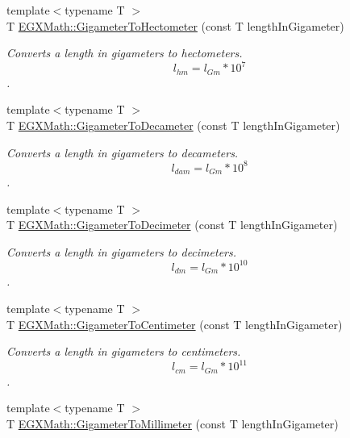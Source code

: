 \begin{DoxyCompactItemize}
{\footnotesize template$<$typename T $>$ }\\T \mbox{\hyperlink{group___e_g_x_math-_conversions-_length_conversions-_gigameter-_s_i_ga25121199c511ed43c20fa9c9bdefc0ca}{E\+G\+X\+Math\+::\+Gigameter\+To\+Hectometer}} (const T length\+In\+Gigameter)
\begin{DoxyCompactList}\small\item\em Converts a length in gigameters to hectometers. \[ l_{hm}=l_{Gm} * 10^{7} \]. \end{DoxyCompactList}\item 
{\footnotesize template$<$typename T $>$ }\\T \mbox{\hyperlink{group___e_g_x_math-_conversions-_length_conversions-_gigameter-_s_i_gab0233167d63c136801ae42faabe64263}{E\+G\+X\+Math\+::\+Gigameter\+To\+Decameter}} (const T length\+In\+Gigameter)
\begin{DoxyCompactList}\small\item\em Converts a length in gigameters to decameters. \[ l_{dam}=l_{Gm} * 10^{8} \]. \end{DoxyCompactList}\item 
{\footnotesize template$<$typename T $>$ }\\T \mbox{\hyperlink{group___e_g_x_math-_conversions-_length_conversions-_gigameter-_s_i_ga9333dddd3642cf160b026516dd760576}{E\+G\+X\+Math\+::\+Gigameter\+To\+Decimeter}} (const T length\+In\+Gigameter)
\begin{DoxyCompactList}\small\item\em Converts a length in gigameters to decimeters. \[ l_{dm}=l_{Gm} * 10^{10} \]. \end{DoxyCompactList}\item 
{\footnotesize template$<$typename T $>$ }\\T \mbox{\hyperlink{group___e_g_x_math-_conversions-_length_conversions-_gigameter-_s_i_gac0fc033ff4b887e157a333cde344b824}{E\+G\+X\+Math\+::\+Gigameter\+To\+Centimeter}} (const T length\+In\+Gigameter)
\begin{DoxyCompactList}\small\item\em Converts a length in gigameters to centimeters. \[ l_{cm}=l_{Gm} * 10^{11} \]. \end{DoxyCompactList}\item 
{\footnotesize template$<$typename T $>$ }\\T \mbox{\hyperlink{group___e_g_x_math-_conversions-_length_conversions-_gigameter-_s_i_ga91b617f8bf6330f1379d3372e4968254}{E\+G\+X\+Math\+::\+Gigameter\+To\+Millimeter}} (const T length\+In\+Gigameter)

\end{DoxyCompactItemize}
